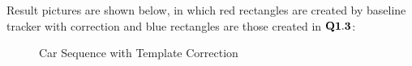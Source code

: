 \documentclass[11pt]{article} \usepackage{fullpage} \usepackage{graphicx} \usepackage{epstopdf} \usepackage{color} \usepackage{psfrag} \usepackage{pdfsync}\usepackage{indentfirst}\usepackage{subfigure}\usepackage{float}\usepackage[section]{placeins}
\begin{document}
Result pictures are shown below, in which red rectangles are created by baseline tracker with correction and blue rectangles are those created in $\bold{Q1.3}$:
\begin{figure}[H]
\centering
{}
\caption{Car Sequence with Template Correction}
\end{figure}
\end{document}
